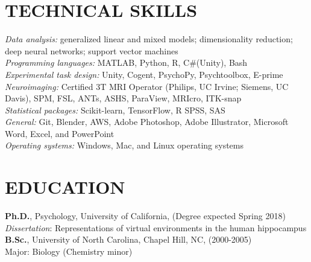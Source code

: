 \documentclass[line,margin,10pt]{res}
\begin{document}
\begin{resume}
\section{TECHNICAL SKILLS} 
\emph{Data analysis:} generalized linear and mixed models; dimensionality reduction; deep neural networks; support vector machines\\
\emph{Programming languages:} MATLAB, Python, R, C\#(Unity), Bash\\
\emph{Experimental task design:} Unity, Cogent, PsychoPy, Psychtoolbox, E-prime  \\
\emph{Neuroimaging:} Certified 3T MRI Operator (Philips, UC Irvine; Siemens, UC Davis), SPM, FSL, ANTs, ASHS, ParaView,  MRIcro, ITK-snap \\
\emph{Statistical packages:} Scikit-learn, TensorFlow, R SPSS, SAS\\
\emph{General:} Git, Blender, AWS, Adobe Photoshop, Adobe Illustrator, Microsoft Word, Excel, and PowerPoint\\
\emph{Operating systems:} Windows, Mac, and Linux operating systems\\



\section{EDUCATION} 
\textbf{Ph.D.}, Psychology, University of California, (Degree expected Spring 2018)\\
\emph{Dissertation}: Representations of virtual environments in the human hippocampus\\
\textbf{B.Sc.}, University of North Carolina, Chapel Hill, NC, (2000-2005)\\
Major: Biology (Chemistry minor)\\
				

\end{resume}
\end{document}
